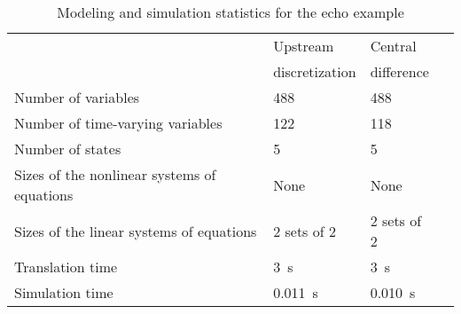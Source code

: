 \begin{table}[h]
  \caption{Modeling and simulation statistics for the echo example}
  \begin{singlespaced}%
    \begin{tabular}{llll}%
      \toprule 
      & Upstream & Central \\
      & discretization & difference \\
        \midrule
      Number of variables & 488 & 488 \\
      Number of time-varying variables & 122 & 118 \\
      Number of states & 5 & 5 \\
      Sizes of the nonlinear systems of equations & None & None \\
      Sizes of the linear systems of equations & 2 sets of 2 & 2 sets of 2 \\
      Translation time & \SI{3}{s} & \SI{3}{s} \\
    Simulation time & \SI{0.011}{s} & \SI{0.010}{s} \\
      \bottomrule
    \end{tabular}
  \end{singlespaced}
\end{table}

